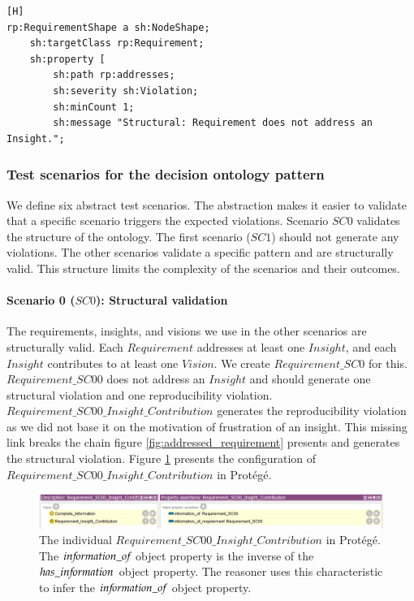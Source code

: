 \begin{lstlisting}[float,language=SHACL,caption={The SHACL shapes we use to detect that a $Requirement$ does not address an $Insight$.},label={SHACL_RP_STRUC_ADD}][H]
rp:RequirementShape a sh:NodeShape;
	sh:targetClass rp:Requirement; 
	sh:property [
		sh:path rp:addresses; 
		sh:severity sh:Violation; 
		sh:minCount 1; 
		sh:message "Structural: Requirement does not address an Insight."; 
\end{lstlisting}

\subsubsection{Test scenarios for the decision ontology pattern}
We define six abstract test scenarios. The abstraction makes it easier to validate that a specific scenario triggers the expected violations. Scenario $SC0$ validates the structure of the ontology. The first scenario ($SC1$) should not generate any violations. The other scenarios validate a specific pattern and are structurally valid. This structure limits the complexity of the scenarios and their outcomes. 

\paragraph{Scenario 0 ($SC0$): Structural validation}
The requirements, insights, and visions we use in the other scenarios are structurally valid. Each $Requirement$ addresses at least one $Insight$, and each $Insight$ contributes to at least one $Vision$. We create $Requirement\_SC0$ for this. $Requirement\_SC00$ does not address an $Insight$ and should generate one structural violation and one reproducibility violation. $Requirement\_SC00\_Insight\_Contribution$ generates the reproducibility violation as we did not base it on the motivation of frustration of an insight. This missing link breaks the chain figure \ref{fig:addressed_requirement} presents and generates the structural violation. Figure \ref{fig:RP_SC0_Requirement_SC00_Insight_Contribution} presents the configuration of $Requirement\_SC00\_Insight\_Contribution$ in Prot\'eg\'e.

\begin{figure}[H]
\centering
  \includegraphics[width=17cm]{../../Images/05_Validation/05_RP_Requirement_SC00_Insight_Contribution.png}
  \caption{The individual $Requirement\_SC00\_Insight\_Contribution$ in Prot\'eg\'e. The $in{\mkern-2mu f\mkern-3mu}ormation\_o{\mkern-2mu f\mkern-3mu}$ object property is the inverse of the $has\_in{\mkern-2mu f\mkern-3mu}ormation$ object property. The reasoner uses this characteristic to infer the $in{\mkern-2mu f\mkern-3mu}ormation\_o{\mkern-2mu f\mkern-3mu}$ object property. }
  \label{fig:RP_SC0_Requirement_SC00_Insight_Contribution}
\end{figure}

